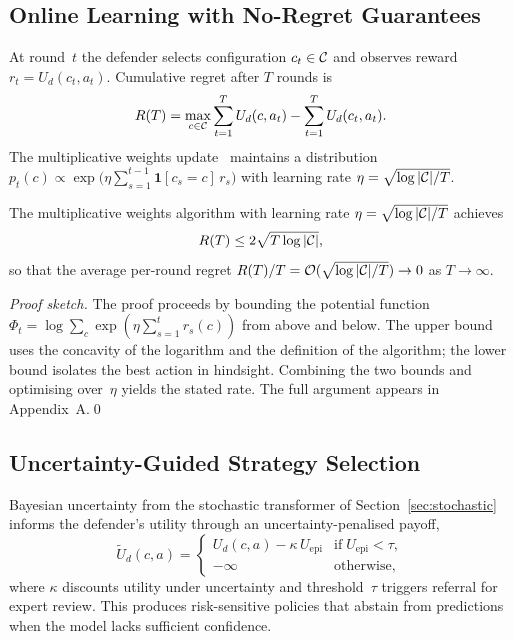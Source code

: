 \subsection{Online Learning with No-Regret Guarantees}

At round~$t$ the defender selects configuration $c_t\in\mathcal{C}$ and observes reward $r_t=U_d(c_t,a_t)$. Cumulative regret after $T$ rounds is
\begin{equation}
R(T)
= \max_{c\in\mathcal{C}}\sum_{t=1}^{T}U_d(c,a_t)
  - \sum_{t=1}^{T}U_d(c_t,a_t).
\label{eq:game_regret}
\end{equation}
The multiplicative weights update~\cite{AroraHK2012,CesaBianchi2006} maintains a distribution $p_t(c)\propto\exp\!\bigl(\eta\sum_{s=1}^{t-1}\mathbf{1}[c_s{=}c]\,r_s\bigr)$ with learning rate $\eta=\sqrt{\log|\mathcal{C}|/T}$.

\begin{theorem}
\label{thm:regret}
The multiplicative weights algorithm with learning rate $\eta=\sqrt{\log|\mathcal{C}|/T}$ achieves
\begin{equation}
R(T)\le 2\sqrt{T\log|\mathcal{C}|},
\label{eq:game_regret_bound}
\end{equation}
so that the average per-round regret $R(T)/T=\mathcal{O}(\sqrt{\log|\mathcal{C}|/T})\to 0$ as $T\to\infty$.
\end{theorem}

\noindent\textit{Proof sketch.} The proof proceeds by bounding the potential function $\Phi_t=\log\sum_c\exp(\eta\sum_{s=1}^{t}r_s(c))$ from above and below. The upper bound uses the concavity of the logarithm and the definition of the algorithm; the lower bound isolates the best action in hindsight. Combining the two bounds and optimising over~$\eta$ yields the stated rate. The full argument appears in Appendix~A.\qed

\subsection{Uncertainty-Guided Strategy Selection}

Bayesian uncertainty from the stochastic transformer of Section~\ref{sec:stochastic} informs the defender's utility through an uncertainty-penalised payoff,
\begin{equation}
\tilde{U}_d(c,a)
= \begin{cases}
U_d(c,a) - \kappa\,U_{\mathrm{epi}} & \text{if}\;U_{\mathrm{epi}}<\tau,\\
-\infty & \text{otherwise},
\end{cases}
\label{eq:game_unc}
\end{equation}
where $\kappa$ discounts utility under uncertainty and threshold~$\tau$ triggers referral for expert review. This produces risk-sensitive policies that abstain from predictions when the model lacks sufficient confidence.

